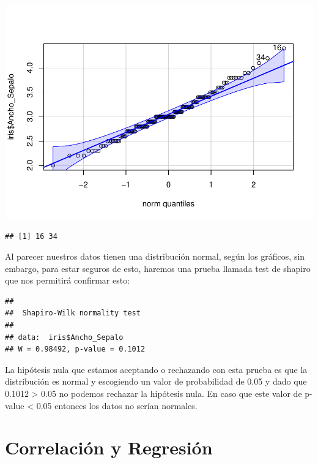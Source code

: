 \documentclass[
]{book}
\newenvironment{Shaded}{\begin{snugshade}}{\end{snugshade}}
\newcommand{\FunctionTok}[1]{\textcolor[rgb]{0.13,0.29,0.53}{\textbf{#1}}}
\newcommand{\NormalTok}[1]{#1}
\newcommand{\SpecialCharTok}[1]{\textcolor[rgb]{0.81,0.36,0.00}{\textbf{#1}}}
\begin{document}
\includegraphics{_main_files/figure-latex/unnamed-chunk-249-1.pdf}

\begin{verbatim}
## [1] 16 34
\end{verbatim}

Al parecer nuestros datos tienen una distribución normal, según los gráficos, sin embargo, para estar seguros de esto, haremos una prueba llamada test de shapiro que nos permitirá confirmar esto:\\

\begin{Shaded}
\end{Shaded}

\begin{verbatim}
## 
##  Shapiro-Wilk normality test
## 
## data:  iris$Ancho_Sepalo
## W = 0.98492, p-value = 0.1012
\end{verbatim}

\hfill\break

La hipótesis nula que estamos aceptando o rechazando con esta prueba es que la distribución es normal y escogiendo un valor de probabilidad de 0.05 y dado que 0.1012 \textgreater{} 0.05 no podemos rechazar la hipótesis nula.
En caso que este valor de p-value \textless{} 0.05 entonces los datos no serían normales.

\section{Correlación y Regresión}\label{correlaciuxf3n-y-regresiuxf3n}
\end{document}
